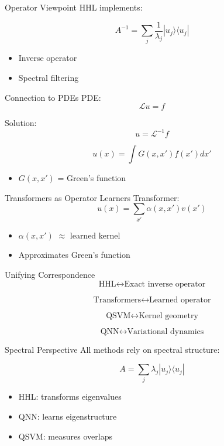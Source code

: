 \documentclass{beamer}
\begin{document}
\begin{frame}{Operator Viewpoint}
HHL implements:

\[
A^{-1} = \sum_j \frac{1}{\lambda_j}|u_j\rangle\langle u_j|
\]

\begin{itemize}
\item Inverse operator
\item Spectral filtering
\end{itemize}
\end{frame}

\begin{frame}{Connection to PDEs}
PDE:
\[
\mathcal{L}u = f
\]

Solution:
\[
u = \mathcal{L}^{-1}f
\]

\[
u(x) = \int G(x,x') f(x')dx'
\]

\begin{itemize}
\item $G(x,x')$ = Green's function
\end{itemize}
\end{frame}

\begin{frame}{Transformers as Operator Learners}
Transformer:
\[
u(x) = \sum_{x'} \alpha(x,x') v(x')
\]

\begin{itemize}
\item $\alpha(x,x')$ $\approx$ learned kernel
\item Approximates Green’s function
\end{itemize}
\end{frame}

\begin{frame}{Unifying Correspondence}
\[
\text{HHL} \leftrightarrow \text{Exact inverse operator}
\]

\[
\text{Transformers} \leftrightarrow \text{Learned operator}
\]

\[
\text{QSVM} \leftrightarrow \text{Kernel geometry}
\]

\[
\text{QNN} \leftrightarrow \text{Variational dynamics}
\]
\end{frame}

\begin{frame}{Spectral Perspective}
All methods rely on spectral structure:

\[
A = \sum_j \lambda_j |u_j\rangle\langle u_j|
\]

\begin{itemize}
\item HHL: transforms eigenvalues
\item QNN: learns eigenstructure
\item QSVM: measures overlaps
\end{itemize}
\end{frame}
\end{document}
